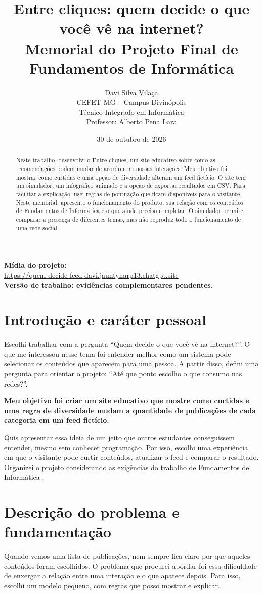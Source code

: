 \documentclass[12pt,a4paper]{article}
\title{Entre cliques: quem decide o que você vê na internet?\\\large Memorial do Projeto Final de Fundamentos de Informática}
\author{Davi Silva Vilaça\\CEFET-MG -- Campus Divinópolis\\Técnico Integrado em Informática\\Professor: Alberto Pena Lara}
\date{30 de outubro de 2026}
\begin{document}
\maketitle
\begin{center}\small
\textbf{Mídia do projeto:}\\
\url{https://quem-decide-feed-davi.jauntyharp13.chatgpt.site}\\[4pt]
\textbf{Versão de trabalho: evidências complementares pendentes.}
\end{center}
\begin{abstract}
Neste trabalho, desenvolvi o Entre cliques, um site educativo sobre como as recomendações podem mudar de acordo com nossas interações. Meu objetivo foi mostrar como curtidas e uma opção de diversidade alteram um feed fictício. O site tem um simulador, um infográfico animado e a opção de exportar resultados em CSV. Para facilitar a explicação, usei regras de pontuação que ficam disponíveis para o visitante. Neste memorial, apresento o funcionamento do produto, sua relação com os conteúdos de Fundamentos de Informática e o que ainda preciso completar. O simulador permite comparar a presença de diferentes temas, mas não reproduz todo o funcionamento de uma rede social.
\end{abstract}
\section{Introdução e caráter pessoal}
Escolhi trabalhar com a pergunta ``Quem decide o que você vê na internet?''. O que me interessou nesse tema foi entender melhor como um sistema pode selecionar os conteúdos que aparecem para uma pessoa. A partir disso, defini uma pergunta para orientar o projeto: ``Até que ponto escolho o que consumo nas redes?''.

\textbf{Meu objetivo foi criar um site educativo que mostre como curtidas e uma regra de diversidade mudam a quantidade de publicações de cada categoria em um feed fictício.}

Quis apresentar essa ideia de um jeito que outros estudantes conseguissem entender, mesmo sem conhecer programação. Por isso, escolhi uma experiência em que o visitante pode curtir conteúdos, atualizar o feed e comparar o resultado. Organizei o projeto considerando as exigências do trabalho de Fundamentos de Informática \cite{enunciado}.

\section{Descrição do problema e fundamentação}
Quando vemos uma lista de publicações, nem sempre fica claro por que aqueles conteúdos foram escolhidos. O problema que procurei abordar foi essa dificuldade de enxergar a relação entre uma interação e o que aparece depois. Para isso, escolhi um modelo pequeno, com regras que posso mostrar e explicar.
\end{document}
